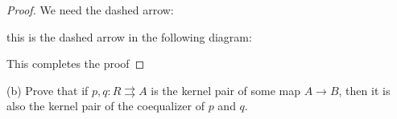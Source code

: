 \documentclass[a4paper]{article}
\DeclareMathOperator{\pr}{\sf pr}
\begin{document}
\begin{proof}
    We need the dashed arrow:
    \begin{center}
    \end{center}

    this is the dashed arrow in the following diagram:

    \begin{center}
    \end{center}


    This completes the proof
\end{proof}

(b) Prove that if $p,q:R\rightrightarrows A$ is the kernel pair of some map $A\to B$, then it is also the kernel pair of the coequalizer of $p$ and $q$.
\end{document}
